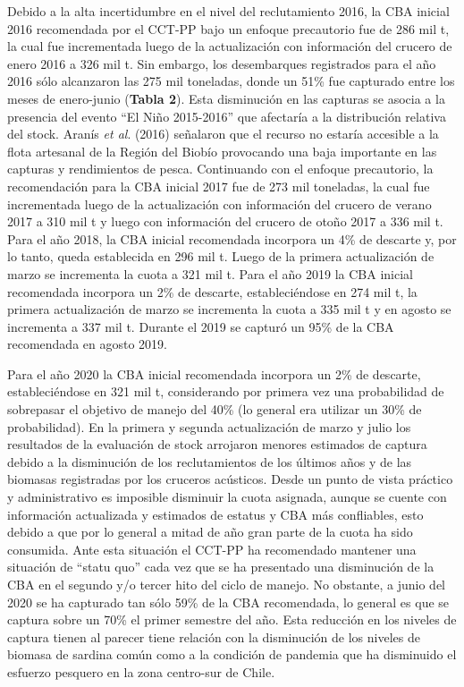 \documentclass[
  spanish,
]{article}
\begin{document}
Debido a la alta incertidumbre en el nivel del reclutamiento 2016, la
CBA inicial 2016 recomendada por el CCT-PP bajo un enfoque precautorio
fue de 286 mil t, la cual fue incrementada luego de la actualización con
información del crucero de enero 2016 a 326 mil t. Sin embargo, los
desembarques registrados para el año 2016 sólo alcanzaron las 275 mil
toneladas, donde un 51\% fue capturado entre los meses de enero-junio
(\textbf{Tabla 2}). Esta disminución en las capturas se asocia a la
presencia del evento ``El Niño 2015-2016'' que afectaría a la
distribución relativa del stock. Aranís \emph{et al}. (2016) señalaron
que el recurso no estaría accesible a la flota artesanal de la Región
del Biobío provocando una baja importante en las capturas y rendimientos
de pesca. Continuando con el enfoque precautorio, la recomendación para
la CBA inicial 2017 fue de 273 mil toneladas, la cual fue incrementada
luego de la actualización con información del crucero de verano 2017 a
310 mil t y luego con información del crucero de otoño 2017 a 336 mil t.
Para el año 2018, la CBA inicial recomendada incorpora un 4\% de
descarte y, por lo tanto, queda establecida en 296 mil t. Luego de la
primera actualización de marzo se incrementa la cuota a 321 mil t. Para
el año 2019 la CBA inicial recomendada incorpora un 2\% de descarte,
estableciéndose en 274 mil t, la primera actualización de marzo se
incrementa la cuota a 335 mil t y en agosto se incrementa a 337 mil t.
Durante el 2019 se capturó un 95\% de la CBA recomendada en agosto 2019.

Para el año 2020 la CBA inicial recomendada incorpora un 2\% de
descarte, estableciéndose en 321 mil t, considerando por primera vez una
probabilidad de sobrepasar el objetivo de manejo del 40\% (lo general
era utilizar un 30\% de probabilidad). En la primera y segunda
actualización de marzo y julio los resultados de la evaluación de stock
arrojaron menores estimados de captura debido a la disminución de los
reclutamientos de los últimos años y de las biomasas registradas por los
cruceros acústicos. Desde un punto de vista práctico y administrativo es
imposible disminuir la cuota asignada, aunque se cuente con información
actualizada y estimados de estatus y CBA más confliables, esto debido a
que por lo general a mitad de año gran parte de la cuota ha sido
consumida. Ante esta situación el CCT-PP ha recomendado mantener una
situación de ``statu quo'' cada vez que se ha presentado una disminución
de la CBA en el segundo y/o tercer hito del ciclo de manejo. No
obstante, a junio del 2020 se ha capturado tan sólo 59\% de la CBA
recomendada, lo general es que se captura sobre un 70\% el primer
semestre del año. Esta reducción en los niveles de captura tienen al
parecer tiene relación con la disminución de los niveles de biomasa de
sardina común como a la condición de pandemia que ha disminuido el
esfuerzo pesquero en la zona centro-sur de Chile.
\end{document}
